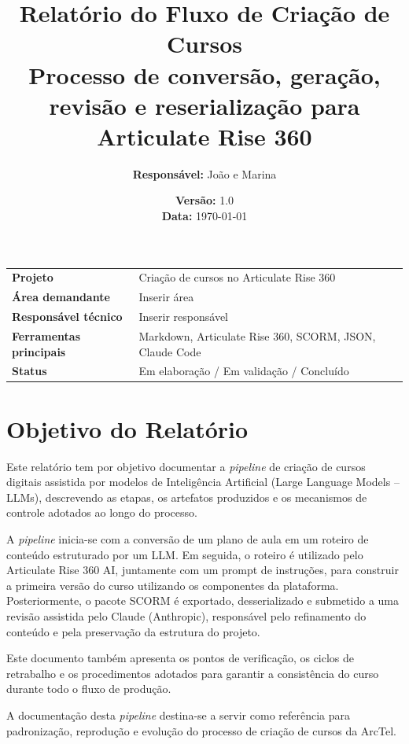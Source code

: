 \documentclass[12pt,a4paper]{article}
\title{\textbf{Relatório do Fluxo de Criação de Cursos}\\
\large Processo de conversão, geração, revisão e reserialização para Articulate Rise 360}
\author{\textbf{Responsável:} João e Marina}
\date{\textbf{Versão:} 1.0 \\ \textbf{Data:} \today}
\begin{document}
\maketitle
\thispagestyle{empty}

\begin{center}
\vfill
\begin{tabular}{ll}
\toprule
\textbf{Projeto} & Criação de cursos no Articulate Rise 360 \\
\textbf{Área demandante} & Inserir área \\
\textbf{Responsável técnico} & Inserir responsável \\
\textbf{Ferramentas principais} & Markdown, Articulate Rise 360, SCORM, JSON, Claude Code \\
\textbf{Status} & Em elaboração / Em validação / Concluído \\
\bottomrule
\end{tabular}
\vfill
\end{center}

\newpage
\tableofcontents
\newpage

\section{Objetivo do Relatório}

Este relatório tem por objetivo documentar a \textit{pipeline} de criação de cursos digitais assistida por modelos de Inteligência Artificial (Large Language Models -- LLMs), descrevendo as etapas, os artefatos produzidos e os mecanismos de controle adotados ao longo do processo.

A \textit{pipeline} inicia-se com a conversão de um plano de aula em um roteiro de conteúdo estruturado por um LLM. Em seguida, o roteiro é utilizado pelo Articulate Rise 360 AI, juntamente com um prompt de instruções, para construir a primeira versão do curso utilizando os componentes da plataforma. Posteriormente, o pacote SCORM é exportado, desserializado e submetido a uma revisão assistida pelo Claude (Anthropic), responsável pelo refinamento do conteúdo e pela preservação da estrutura do projeto.

Este documento também apresenta os pontos de verificação, os ciclos de retrabalho e os procedimentos adotados para garantir a consistência do curso durante todo o fluxo de produção.

A documentação desta \textit{pipeline} destina-se a servir como referência para padronização, reprodução e evolução do processo de criação de cursos da ArcTel.
\end{document}
